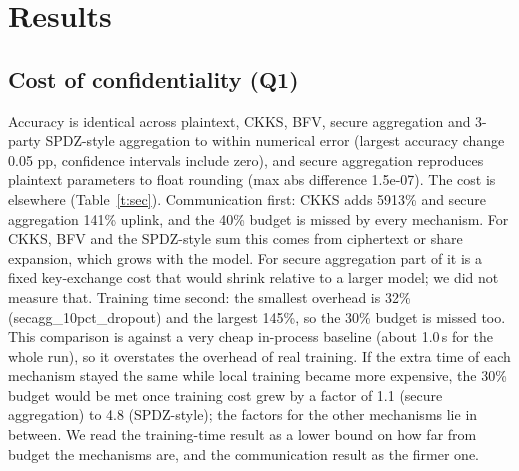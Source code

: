 \documentclass[conference]{IEEEtran}
\begin{document}
\section{Results}
\subsection{Cost of confidentiality (Q1)}
Accuracy is identical across plaintext, CKKS, BFV, secure aggregation and 3-party SPDZ-style aggregation to within numerical error (largest accuracy change 0.05 pp, confidence intervals include zero), and secure aggregation reproduces plaintext parameters to float rounding (max abs difference 1.5e-07). The cost is elsewhere (Table~\ref{t:sec}). Communication first: CKKS adds 5913\% and secure aggregation 141\% uplink, and the 40\% budget is missed by every mechanism. For CKKS, BFV and the SPDZ-style sum this comes from ciphertext or share expansion, which grows with the model. For secure aggregation part of it is a fixed key-exchange cost that would shrink relative to a larger model; we did not measure that. Training time second: the smallest overhead is 32\% (secagg\_10pct\_dropout) and the largest 145\%, so the 30\% budget is missed too. This comparison is against a very cheap in-process baseline (about 1.0\,s for the whole run), so it overstates the overhead of real training. If the extra time of each mechanism stayed the same while local training became more expensive, the 30\% budget would be met once training cost grew by a factor of 1.1 (secure aggregation) to 4.8 (SPDZ-style); the factors for the other mechanisms lie in between. We read the training-time result as a lower bound on how far from budget the mechanisms are, and the communication result as the firmer one.
\begin{table}[t]\centering\caption{Confidentiality mechanisms vs plaintext (measured, virtual clients, 10 seeds, randomised run order; overheads are relative to plaintext, with 95\% bootstrap intervals; communication counts the uplink only).}\label{t:sec}\scriptsize
{}\end{table}
\end{document}
